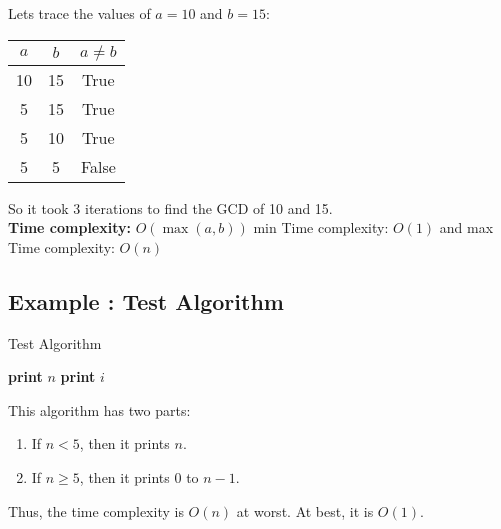 \documentclass{article}
\begin{document}
Lets trace the values of $a = 10$ and $b = 15$:
\begin{table}[H]
    \centering
    \begin{tabular}{|c|c|c|}
        \hline
        $a$ & $b$ & $a \neq b$\\
        \hline
        10 & 15 & True\\
        5 & 15 & True\\
        5 & 10 & True\\
        5 & 5 & False\\
        \hline
    \end{tabular}
\end{table}
So it took 3 iterations to find the GCD of 10 and 15.\\
\textbf{Time complexity:} $O(\max(a,b))$
min Time complexity: $O(1)$ and max Time complexity: $O(n)$

\subsection{Example : Test Algorithm}
\begin{algorithm}[H]
    \caption{Test Algorithm}\label{test}
    \begin{algorithmic}
                \State \textbf{print} $n$
            \Else
                    \State \textbf{print} $i$
                \EndFor
            \EndIf
        \EndProcedure
    \end{algorithmic}
\end{algorithm}
This algorithm has two parts:
\begin{enumerate}
    \item If $n < 5$, then it prints $n$.
    \item If $n \geq 5$, then it prints $0$ to $n-1$.
\end{enumerate}
Thus, the time complexity is $O(n)$ at worst. At best, it is $O(1)$.
\end{document}
